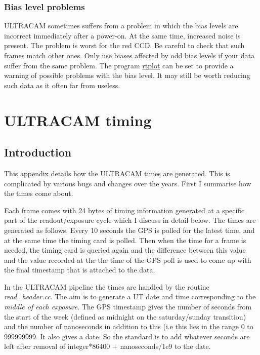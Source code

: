 \documentclass[10pt,a4paper,twocolumn]{article}
\newcommand{\main}{http://quetzel.csc.warwick.ac.uk/phsaap/software}
\newcommand{\ultracam}{\main/ultracam/html}
\begin{document}
\subsubsection{Bias level problems}
\label{prob:bias}

ULTRACAM sometimes suffers from a problem in which the bias levels are
incorrect immediately after a power-on. At the same time, increased
noise is present. The problem is worst for the red CCD.  Be careful to
check that such frames match other ones. Only use biases affected by
odd bias levels if your data suffer from the same problem. The program
\href{\ultracam/rtplot.html}{rtplot} can be set to provide a warning
of possible problems with the bias level. It may still be worth
reducing such data as it often far from useless.

\appendix

\section{ULTRACAM timing}

\subsection{Introduction}

This appendix details how the ULTRACAM times are generated. This is
complicated by various bugs and changes over the years. First I
summarise how the times come about. 

Each frame comes with 24 bytes of timing information generated at a
specific part of the readout/exposure cycle which I discuss in detail
below. The times are generated as follows. Every 10 seconds the GPS is
polled for the latest time, and at the same time the timing card is
polled. Then when the time for a frame is needed, the timing card is
queried again and the difference between this value and the value
recorded at the the time of the GPS poll is used to come up with the
final timestamp that is attached to the data.

In the ULTRACAM pipeline the times are handled by the routine
\emph{read\_header.cc}. The aim is to generate a UT date and time
corresponding to the \emph{middle of each exposure}. The GPS
timestamp gives the number of seconds from the start of the week
(defined as midnight on the saturday/sunday transition) and the number
of nanoseconds in addition to this (i.e this lies in the range 0 to
999999999. It also gives a date. So the standard is to add whatever
seconds are left after removal of integer*86400 + nanoseconds/1e9 to
the date.
\end{document}

